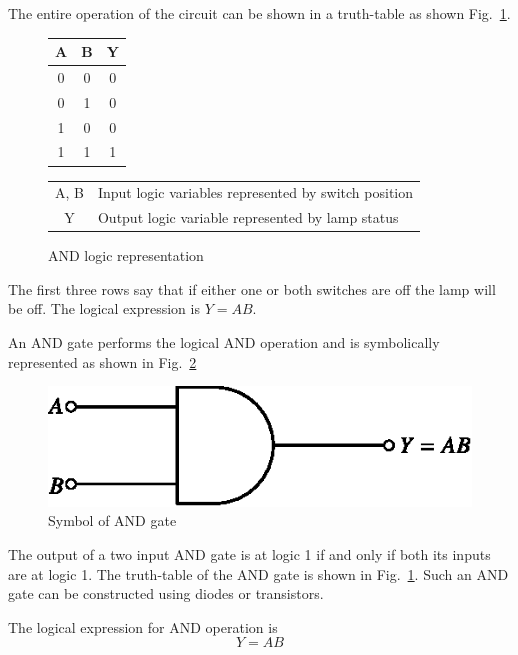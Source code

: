 The entire operation of the circuit can be shown in a truth-table as shown Fig.~\ref{fig6.3}.
\begin{figure}[H]
\begin{center}
\begin{minipage}[c]{2.7cm}
\begin{tabular}{|cc|c|}
\hline
{\bf A} & {\bf B} & {\bf Y}\\
\hline
0 & 0 & 0\\
0 & 1 & 0\\
1 & 0 & 0\\
1 & 1 & 1\\
\hline
\end{tabular}
\end{minipage}
\begin{minipage}[c]{6cm}
\begin{tabular}{c@{\;:\;}p{5.2cm}}
A, B & Input logic variables represented by switch position\\
Y & Output logic variable represented by lamp status
\end{tabular}
\end{minipage}
\end{center}
\caption{AND logic representation}\label{fig6.3}
\end{figure}

The first three rows say that if either one or both switches are off the lamp will be off. The logical expression is $Y=AB$.

An AND gate performs the logical AND operation and is symbolically represented as shown in Fig.~\ref{fig6.4}
\begin{figure}[H]
\centering
\includegraphics{chap6/fig78_6.4.eps}
\caption{Symbol of AND gate}\label{fig6.4}
\end{figure}

The output of a two input AND gate is at logic 1 if and only if both its inputs are at logic 1. The truth-table of the AND gate is shown in Fig.~\ref{fig6.3}. Such an AND gate can be constructed using diodes or transistors.

The logical expression for AND operation is
$$
Y=AB
$$

